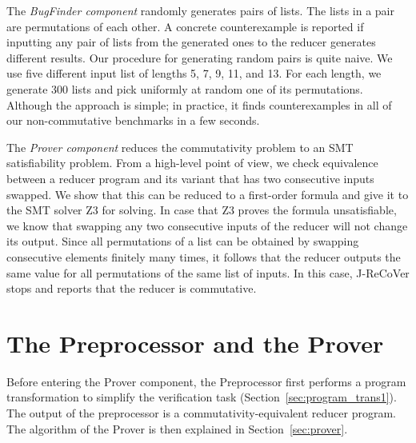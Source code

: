 \documentclass{llncs}
\begin{document}
\enlargethispage{4mm}

The \emph{BugFinder component} randomly generates pairs of lists. The lists in a
pair are permutations of each other. A concrete counterexample is reported if
inputting any pair of lists from the generated ones to the reducer generates
different results. Our procedure for generating random pairs is quite naive. We
use five different input list of lengths 5, 7, 9, 11, and 13. For each length,
we generate 300 lists and pick uniformly at random one of its permutations.
Although the approach is simple; in practice, it finds counterexamples in all of
our non-commutative benchmarks in a few seconds. 

The \emph{Prover component} reduces the commutativity problem to an SMT
satisfiability problem. From a high-level point of view, we check equivalence
between a reducer program and its variant that has two consecutive inputs
swapped. We show that this can be reduced to a first-order formula and give it
to the SMT solver Z3 for solving. In case that Z3 proves the formula
unsatisfiable, we know that swapping any two consecutive inputs of the reducer
will not change its output. Since all permutations of a list can be obtained by
swapping consecutive elements finitely many times, it follows that the reducer
outputs the same value for all permutations of the same list of inputs. In this
case, J-ReCoVer stops and reports that the reducer is commutative.

\vspace*{-2mm}
\section{The Preprocessor and the Prover} \label{sec:preprocessor_prover}
\vspace*{-1mm}

Before entering the Prover component, the Preprocessor first performs a
program transformation to simplify the verification task
(Section~\ref{sec:program_trans1}). The output of the preprocessor is a
commutativity-equivalent reducer program. The algorithm of the Prover is then
explained in Section~\ref{sec:prover}. 

\vspace*{-2mm}
\end{document}
